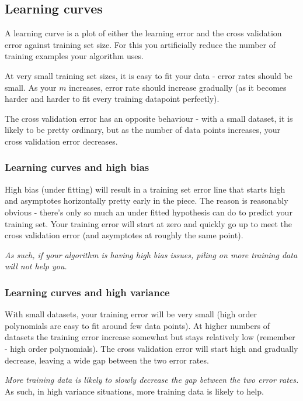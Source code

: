 \subsection{Learning curves}

A learning curve is a plot of either the learning error and the cross validation error against training set size. For this you artificially reduce the number of training examples your algorithm uses.

At very small training set sizes, it is easy to fit your data - error rates should be small. As your $m$ increases, error rate should increase gradually (as it becomes harder and harder to fit every training  datapoint perfectly).

The cross validation error has an opposite behaviour - with a small dataset, it is likely to be pretty ordinary, but as the number of data points increases, your cross validation error decreases.

\subsubsection{Learning curves and high bias}

High bias (under fitting) will result in a training set error line that starts high and asymptotes horizontally pretty early in the piece. The reason is reasonably obvious - there's only so much an under fitted hypothesis can do to predict your training set. Your training error will start at zero and quickly go up to meet the cross validation error (and asymptotes at roughly the same point).

\emph{As such, if your algorithm is having high bias issues, piling on more training data will not help you.}

\subsubsection{Learning curves and high variance}

With small datasets, your training error will be very small (high order polynomials are easy to fit around few data points). At higher numbers of datasets the training error increase somewhat but stays relatively low (remember - high order polynomials).
The cross validation error will start high and gradually decrease, leaving a wide gap between the two error rates.

\emph{More training data is likely to slowly decrease the gap between the two error rates.} As such, in high variance situations, more training data is likely to help.


